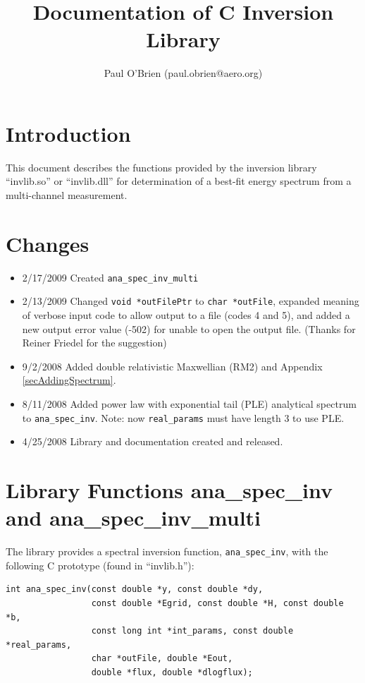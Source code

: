 \documentclass{article}    %
\title{Documentation of C Inversion Library}
\author{Paul O'Brien (paul.obrien@aero.org)}         %
\begin{document}

\maketitle                 %

\tableofcontents

\section{Introduction}

This document describes the functions provided by the inversion
library ``invlib.so'' or ``invlib.dll'' for determination of a
best-fit energy spectrum from a multi-channel measurement.

\section{Changes}
\label{secChanges}

\begin{itemize}
\item{2/17/2009} Created \verb|ana_spec_inv_multi|
\item{2/13/2009} Changed \verb|void *outFilePtr| to \verb|char *outFile|, 
  expanded meaning of verbose input code to allow output to a file (codes 4 and 5), 
  and added a new output error value (-502) for unable to open the output file. 
  (Thanks for Reiner Friedel for the suggestion)
\item{9/2/2008} Added double relativistic Maxwellian (RM2) and Appendix \ref{secAddingSpectrum}.
\item{8/11/2008} Added power law with exponential tail (PLE)
  analytical spectrum to \verb|ana_spec_inv|. Note: now
  \verb|real_params| must have length 3 to use PLE.
\item{4/25/2008} Library and documentation created and released.
\end{itemize}

\section{Library Functions ana\_spec\_inv and ana\_spec\_inv\_multi}

The library provides a spectral inversion function,
\verb|ana_spec_inv|, with the following C prototype (found in
``invlib.h''):
\begin{verbatim}
int ana_spec_inv(const double *y, const double *dy, 
                 const double *Egrid, const double *H, const double *b,
                 const long int *int_params, const double *real_params,
                 char *outFile, double *Eout, 
                 double *flux, double *dlogflux);
\end{verbatim}
                  
\end{document}
